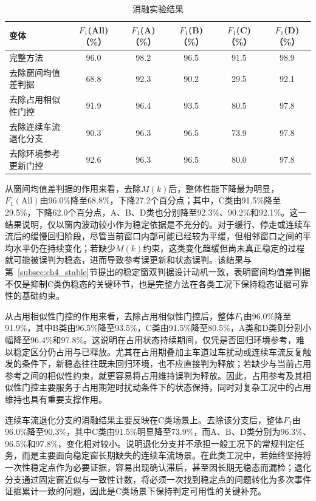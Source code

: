 \documentclass{xdupgthesis}
\begin{document}
\begin{table}[!htbp]
    \centering
    \caption{消融实验结果}
    \label{tab:ch4_ablation}
    \setlength{\tabcolsep}{6pt}
    \begin{tabularx}{\linewidth}{Y c c c c c}
        \toprule
        变体 & $F_1$(All)（\%） & $F_1$(A)（\%） & $F_1$(B)（\%） & $F_1$(C)（\%） & $F_1$(D)（\%） \\
        \midrule
        完整方法 & 96.0 & 98.2 & 96.5 & 91.5 & 98.9 \\
        去除窗间均值差判据 & 68.8 & 92.3 & 90.2 & 29.5 & 92.1 \\
        去除占用相似性门控 & 91.9 & 96.4 & 93.5 & 80.5 & 97.8 \\
        去除连续车流退化分支 & 90.3 & 96.3 & 96.5 & 73.9 & 97.8 \\
        去除环境参考更新门控 & 92.6 & 96.3 & 96.5 & 80.0 & 97.8 \\
        \bottomrule
    \end{tabularx}
\end{table}

从窗间均值差判据的作用来看，去除$M(k)$后，整体性能下降最为明显，$F_1(\mathrm{All})$由96.0\%降至68.8\%，下降27.2个百分点；其中，C类由91.5\%降至29.5\%，下降62.0个百分点，A、B、D类也分别降至92.3\%、90.2\%和92.1\%。这一结果说明，仅以窗内波动较小作为稳定依据是不充分的。对于缓行、停走或连续车流后的缓慢回归阶段，尽管当前窗口内部可能已经较为平缓，但相邻窗口之间的平均水平仍在持续变化；若缺少$M(k)$约束，这类变化趋缓但尚未真正稳定的过程就可能被误判为稳态，进而导致参考误更新和状态误判。该结果与第~\ref{subsec:ch4_stable}节提出的稳定窗双判据设计动机一致，表明窗间均值差判据不仅是抑制C类伪稳态的关键环节，也是完整方法在各类工况下保持稳态证据可靠性的基础约束。

从占用相似性门控的作用来看，去除占用相似性门控后，整体$F_1$由96.0\%降至91.9\%，其中B类由96.5\%降至93.5\%，C类由91.5\%降至80.5\%，A类和D类则分别小幅降至96.4\%和97.8\%。这说明在占用状态持续期间，仅凭是否回归环境参考，难以稳定区分仍占用与已释放。尤其在占用期叠加主车道过车扰动或连续车流反复触发的条件下，新稳态往往既未回归环境，也不应直接判为释放；若缺少与当前占用参考之间的相似性约束，就更容易将占用维持误判为释放。因此，占用参考及其相似性门控主要服务于占用期短时扰动条件下的状态保持，同时对复杂工况中的占用维持也具有重要支撑作用。

连续车流退化分支的消融结果主要反映在C类场景上。去除该分支后，整体$F_1$由96.0\%降至90.3\%，其中C类由91.5\%明显降至73.9\%，而A、B、D类分别为96.3\%、96.5\%和97.8\%，变化相对较小。说明退化分支并不承担一般工况下的常规判定任务，而是主要面向稳定窗长期缺失的连续车流场景。在此类工况中，若始终坚持将一次性稳定点作为必要证据，容易出现确认滞后，甚至因长期无稳态而漏检；退化分支通过固定窗近似与一致性计数，将必须一次找到稳定点的问题转化为多次事件证据累计一致的问题，因此是C类场景下保持判定可用性的关键补充。
\end{document}
